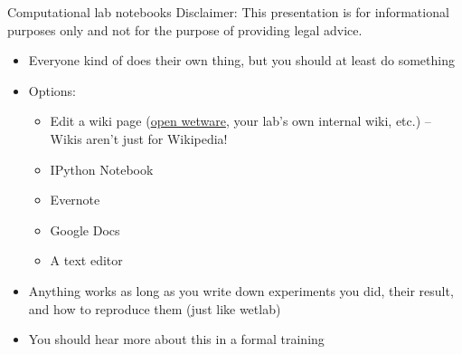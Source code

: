\begin{frame}{Computational lab notebooks}
  Disclaimer: This presentation is for informational purposes only and not for the purpose of providing legal advice. 
  \begin{itemize}
  \item Everyone kind of does their own thing, but you should at least do something
  \item Options:
    \begin{itemize}
    \item Edit a wiki page
      (\href{http://openwetware.org/wiki/Main_Page}{open wetware}, 
      your lab's own internal wiki, etc.) -- Wikis aren't just for Wikipedia!
    \item IPython Notebook
    \item Evernote
    \item Google Docs
    \item A text editor
    \end{itemize}

  \item Anything works as long as you write down experiments you did,
    their result, and how to reproduce them (just like wetlab)
  \item You should hear more about this in a formal training
  \end{itemize}
\end{frame}
